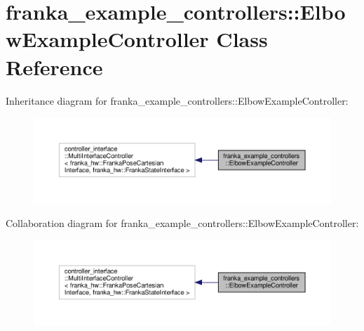 \hypertarget{classfranka__example__controllers_1_1_elbow_example_controller}{}\section{franka\+\_\+example\+\_\+controllers\+:\+:Elbow\+Example\+Controller Class Reference}
\label{classfranka__example__controllers_1_1_elbow_example_controller}


Inheritance diagram for franka\+\_\+example\+\_\+controllers\+:\+:Elbow\+Example\+Controller\+:
\nopagebreak
\begin{figure}[H]
\begin{center}
\leavevmode
\includegraphics[width=350pt]{classfranka__example__controllers_1_1_elbow_example_controller__inherit__graph}
\end{center}
\end{figure}


Collaboration diagram for franka\+\_\+example\+\_\+controllers\+:\+:Elbow\+Example\+Controller\+:
\nopagebreak
\begin{figure}[H]
\begin{center}
\leavevmode
\includegraphics[width=350pt]{classfranka__example__controllers_1_1_elbow_example_controller__coll__graph}
\end{center}
\end{figure}
